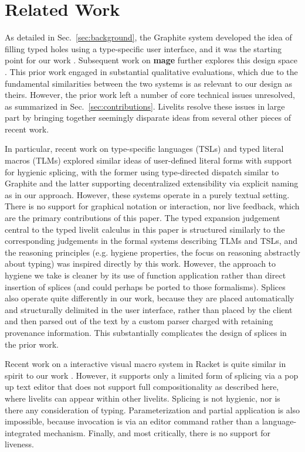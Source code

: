 \section{Related Work}\label{sec:related-work}
As detailed in Sec.~\ref{sec:background},
the Graphite system developed the idea of filling 
typed holes using a type-specific user interface, and it was the starting 
point for our work \cite{Graphite}.
Subsequent work on \textbf{mage} further explores this design space \cite{DBLP:conf/uist/KeryRHMWP20}.
This prior work engaged in substantial qualitative evaluations, 
which due to the fundamental similarities between the two systems 
is as relevant to our design as theirs. However, the prior work 
left a number of core technical issues unresolved, 
as summarized in Sec.~\ref{sec:contributions}. 
Livelits resolve these issues in large part by bringing together 
seemingly disparate ideas from several other pieces of recent work.

In particular, recent work on type-specific languages (TSLs) \cite{TSLs} 
and typed literal macros (TLMs) \cite{TLMs}
explored similar ideas of user-defined
literal forms with support for hygienic splicing, with the former 
using type-directed dispatch similar to Graphite and the latter supporting 
decentralized extensibility via explicit naming as in our approach. 
However, these systems operate in a purely 
textual setting. There is no support for graphical notation or 
interaction, nor live feedback, which are the primary contributions of this paper.
The typed expansion judgement central to the typed livelit calculus in this paper 
is structured similarly 
to the corresponding judgements in the formal systems describing TLMs and TSLs,
and the reasoning principles (e.g. hygiene properties, the focus on reasoning abstractly 
about typing) was inspired directly by this work. However, the  
approach to hygiene we take is cleaner by its use of function application 
rather than direct insertion of splices (and could perhaps be ported to those formalisms).
Splices also operate quite differently in our work,
because they are placed automatically and structurally delimited in the user interface, rather than 
placed by the client and then parsed out of the text by a custom parser charged 
with retaining provenance information.
This substantially complicates the design of splices in the prior work.

Recent work on a interactive visual macro system in Racket 
is quite similar in spirit to our work \cite{interactive-visual-syntax}.
However, it supports only a limited form of splicing via a pop up text editor
that does not support full compositionality as described here, where livelits 
can appear within other livelits. Splicing is not hygienic, nor is there any 
consideration of typing. Parameterization and partial application is also impossible, because invocation 
is via an editor command rather than a language-integrated mechanism. Finally,
and most critically, there is no support for liveness. 

